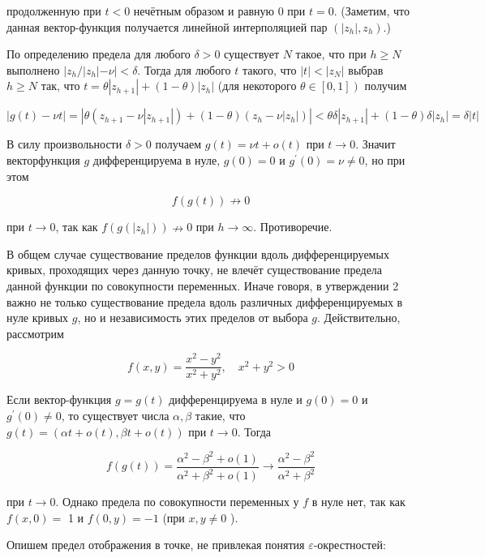 \documentclass[a4paper,12pt]{article} %
\begin{document}
	продолженную при $t<0$ нечётным образом и равную 0 при $t=0$. (Заметим, что данная вектор-функция получается линейной интерполяцией пар $\left(\left|z_{h}\right|, z_{h}\right)$.)
	
	По определению предела для любого $\delta>0$ существует $N$ такое, что при $h \geq N$ выполнено $\left|z_{h} /\right| z_{h}|-\nu|<\delta$. Тогда для любого $t$ такого, что $|t|<\left|z_{N}\right|$ выбрав $h \geq N$ так, что $t=\theta\left|z_{h+1}\right|+(1-\theta)\left|z_{h}\right|$ (для некоторого $\left.\theta \in[0,1]\right)$ получим
	
	$|g(t)-\nu t|=\left|\theta\left(z_{h+1}-\nu\left|z_{h+1}\right|\right)+(1-\theta)\left(z_{h}-\nu\left|z_{h}\right|\right)\right|<\theta \delta\left|z_{h+1}\right|+(1-\theta) \delta\left|z_{h}\right|=\delta|t|$
	
	В силу произвольности $\delta>0$ получаем $g(t)=\nu t+o(t)$ при $t \rightarrow 0$. Значит векторфункция $g$ дифференцируема в нуле, $g(0)=0$ и $g^{\prime}(0)=\nu \neq 0$, но при этом
	
	$$
	f(g(t)) \not \rightarrow 0
	$$
	
	при $t \rightarrow 0$, так как $f\left(g\left(\left|z_{h}\right|\right)\right) \nrightarrow 0$ при $h \rightarrow \infty$. Противоречие.
	
	В общем случае существование пределов функции вдоль дифференцируемых кривых, проходящих через данную точку, не влечёт существование предела данной функции по совокупности переменных. Иначе говоря, в утверждении 2 важно не только существование предела вдоль различных дифференцируемых в нуле кривых $g$, но и независимость этих пределов от выбора $g$. Действительно, рассмотрим
	
	$$
	f(x, y)=\frac{x^{2}-y^{2}}{x^{2}+y^{2}}, \quad x^{2}+y^{2}>0
	$$
	
	Если вектор-функция $g=g(t)$ дифференцируема в нуле и $g(0)=0$ и $g^{\prime}(0) \neq 0$, то существует числа $\alpha, \beta$ такие, что $g(t)=(\alpha t+o(t), \beta t+o(t))$ при $t \rightarrow 0$. Тогда
	
	$$
	f(g(t))=\frac{\alpha^{2}-\beta^{2}+o(1)}{\alpha^{2}+\beta^{2}+o(1)} \rightarrow \frac{\alpha^{2}-\beta^{2}}{\alpha^{2}+\beta^{2}}
	$$
	
	при $t \rightarrow 0$. Однако предела по совокупности переменных у $f$ в нуле нет, так как $f(x, 0)=$ 1 и $f(0, y)=-1$ (при $x, y \neq 0$ ).
	
	Опишем предел отображения в точке, не привлекая понятия $\varepsilon$-окрестностей:
	
\end{document}
